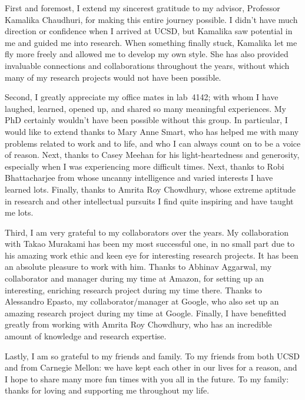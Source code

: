 \documentclass[12pt]{ucsddissertation}
\begin{document}
\begin{acknowledgements}
First and foremost, I extend my sincerest gratitude to my advisor,
Professor Kamalika Chaudhuri, for making this entire journey possible.
I didn't have much direction or confidence when I arrived at UCSD,
but Kamalika saw potential in me and guided me into research. When 
something finally stuck, Kamalika let me fly more freely and allowed me
to develop my own style. She has also provided invaluable connections and
collaborations throughout the years, without which many of my research 
projects would not have been possible.

Second, I greatly appreciate my office mates 
in lab~4142; with whom I have laughed, learned, opened up, and shared
so many meaningful experiences. My PhD certainly wouldn't have been possible without 
this group. In particular, I would like to extend thanks to
Mary Anne Smart, who has helped me with many problems related to work and to 
life, and who I can always count on to be a voice of reason. Next,
thanks to Casey Meehan for his light-heartedness and generosity,
especially when I was experiencing more difficult times. Next, 
thanks to Robi Bhattacharjee from whose uncanny intelligence and varied interests
I have learned lots. Finally, thanks to Amrita Roy Chowdhury, whose
extreme aptitude in research and other intellectual pursuits I find quite
inspiring and have taught me lots.

Third, I am very grateful to my collaborators over the years. My collaboration
with Takao Murakami has been my most successful one, in no small part due to 
his amazing work ethic and keen eye for interesting research projects. It has
been an absolute pleasure to work with him. Thanks to Abhinav Aggarwal, my
collaborator and manager during my time at Amazon, for setting up an interesting,
enriching research project during my time there. Thanks to Alessandro Epasto, my 
collaborator/manager at Google, who also set up an amazing research project during my
time at Google. Finally, I have benefitted greatly from working with 
Amrita Roy Chowdhury, who has an incredible amount of knowledge and research 
expertise.

Lastly, I am so grateful to my friends and family. To my friends 
from both UCSD and from Carnegie
Mellon: we have kept each other in our lives for a reason, and I hope
to share many more fun times with you all in the future. To my family: thanks
for loving and supporting me throughout my life.



\end{acknowledgements}
\end{document}
